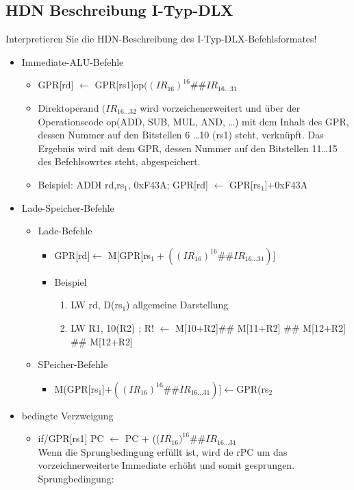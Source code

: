 \subsection{HDN Beschreibung I-Typ-DLX}
Interpretieren Sie die HDN-Beschreibung des I-Typ-DLX-Befehlsformates!
\begin{itemize}
	\item Immediate-ALU-Befehle
	\begin{itemize}
		\item GPR[rd] $\leftarrow$ GPR[rs1]op$((IR_{16})^{16}\#\# IR_{16\ldots 31}$
		\item Direktoperand $(IR_{16\ldots 32}$ wird vorzeichenerweitert und über der Operationscode op(ADD, SUB, MUL, AND, \ldots) mit dem Inhalt des GPR, dessen Nummer auf den Bitstellen 6 \ldots 10 (rs1) steht, verknüpft. Das Ergebnis wird mit dem GPR, dessen Nummer auf den Bitstellen 11\ldots 15 des Befehlsowrtes steht, abgespeichert. 
		\item Beispiel: ADDI rd,rs$_1$, 0xF43A; GPR[rd] $\leftarrow$ GPR[rs$_1$]+0xF43A
	\end{itemize}
	\item Lade-Speicher-Befehle
	\begin{itemize}
		\item Lade-Befehle
		\begin{itemize}
			\item GPR[rd]$\leftarrow$ M[GPR[rs$_1+((IR_{16})^{16}\#\# IR_{16\ldots 31})$]				\item Beispiel
			\begin{enumerate}
		\item LW rd, D(rs$_1$) allgemeine Darstellung
		\item LW R1, 10(R2) ; R! $\leftarrow$ M[10+R2]\#\# M[11+R2] \#\# M[12+R2] \#\# M[12+R2]
			\end{enumerate}
		\end{itemize}
		\item SPeicher-Befehle
		\begin{itemize}
			\item M(GPR[rs$_1$]+$((IR_{16})^{16}\#\# IR_{16\ldots 31})$]$\leftarrow$GPR(rs$_2$
		\end{itemize}
	\end{itemize}
	\item bedingte Verzweigung
	\begin{itemize}
		\item if/GPR[rs1] PC $\leftarrow$ PC + (($IR_{16})^{16} \#\# IR_{16 \ldots 31}$ \\ Wenn die Sprungbedingung erfüllt ist, wird de rPC um das vorzeichnerweiterte Immediate erhöht und somit gesprungen. Sprungbedingung:

\end{itemize}
\end{itemize}
